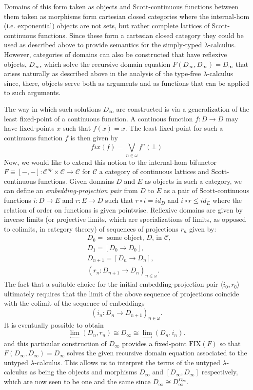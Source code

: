\documentclass[10pt]{article}
\theoremstyle{plain}
\theoremstyle{definition}
\theoremstyle{remark}
\begin{document}
Domains of this form taken as objects and Scott-continuous functions between them taken as morphisms form cartesian closed categories where the internal-hom (i.e. exponential) objects are not sets, but rather complete lattices of Scott-continuous functions. Since these form a cartesian closed category they could be used as described above to provide semantics for the simply-typed $\lambda$-calculus. However, categories of domains can also be constructed that have reflexive objects, $D_\infty$, which solve the recursive domain equation $F(D_{\infty},D_{\infty})=D_{\infty}$ that arises naturally as described above in the analysis of the type-free $\lambda$-calculus since, there, objects serve both as arguments and as functions that can be applied to such arguments.

The way in which such solutions $D_\infty$ are constructed is via a generalization of the least fixed-point of a continuous function. A continous function $f \colon D \rightarrow D$ may have fixed-points $x$ such that $f(x)=x$. The least fixed-point for such a continuous function $f$ is then given by
$$
fix(f) = \bigvee_{n \in \omega} f^n(\bot)
$$
Now, we would like to extend this notion to the internal-hom bifunctor $F \equiv [-,-] \colon \mathcal{C}^{op} \times \mathcal{C} \rightarrow \mathcal{C}$ for $\mathcal{C}$ a category of continuous lattices and Scott-continuous functions. Given domains $D$ and $E$ as objects in such a category, we can define an \emph{embedding-projection pair} from $D$ to $E$ as a pair of Scott-continuous functions $i \colon D \rightarrow E$ and $r \colon E \rightarrow D$ such that $r \circ i = id_D$ and $i \circ r \leq id_E$ where the relation of order on functions is given pointwise. Reflexive domains are given by inverse limits (or projective limits, which are specializations of limits, as opposed to colimits, in category theory) of sequences of projections $r_n$ given by:
\begin{align*}
&D_0 = \mbox{ some object, $D$, in } \mathcal{C},\\
&D_1 = [D_0 \rightarrow D_0],\\
&D_{n+1} = [D_n \rightarrow D_n],\\
&(r_n \colon D_{n+1} \rightarrow D_n)_{n \in \omega}.
\end{align*}
The fact that a suitable choice for the initial embedding-projection pair $\langle i_0, r_0 \rangle$ ultimately requires that the limit of the above sequence of projections coincide with the colimit of the sequence of embeddings
$$
(i_n \colon D_{n} \rightarrow D_{n+1})_{n \in \omega}.
$$
It is eventually possible to obtain
$$
\lim_{\leftarrow} (D_n, r_n) \cong D_\infty \cong \lim_{\rightarrow} (D_n, i_n).
$$
and this particular construction of $D_{\infty}$ provides a fixed-point $\text{FIX}(F)$ so that $F(D_{\infty},D_{\infty}) = D_{\infty}$ solves the given recursive domain equation associated to the untyped $\lambda$-calculus. This allows us to interpret the terms of the untyped $\lambda$-calculus as being the objects and morphisms $D_{\infty}$ and $[D_{\infty},D_{\infty}]$ respectively, which are now seen to be one and the same since $D_{\infty} \cong D_{\infty}^{D_{\infty}}$.
\end{document}
